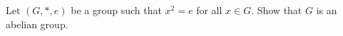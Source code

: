   Let $(G, *, e)$ be a group such that
  $x^2 = e$ for all $x \in G$.
  Show that $G$ is an abelian group.
